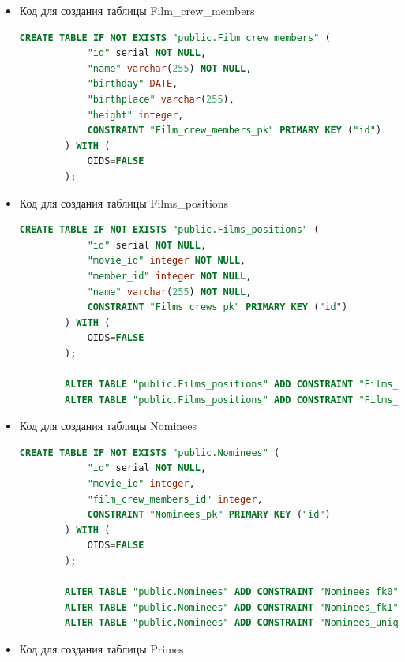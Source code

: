 \documentclass[a4paper,12pt]{article}
\renewcommand{\^}[2]{#1^{\, #2} \kern -1pt}
\newcommand{\1}{\kern 1pt}
\newcommand{\0}{\kern -1pt}
\begin{document}
\begin{itemize}
	\item Код для создания таблицы Film\_crew\_members
	
	\begin{lstlisting}[style=vscode-dark, language=SQL, label={code:sql}]
		CREATE TABLE IF NOT EXISTS "public.Film_crew_members" (
			"id" serial NOT NULL,
			"name" varchar(255) NOT NULL,
			"birthday" DATE,
			"birthplace" varchar(255),
			"height" integer,
			CONSTRAINT "Film_crew_members_pk" PRIMARY KEY ("id")
		) WITH (
			OIDS=FALSE
		);
	\end{lstlisting}

	\item Код для создания таблицы Films\_positions

	\begin{lstlisting}[style=vscode-dark, language=SQL, label={code:sql}]
		CREATE TABLE IF NOT EXISTS "public.Films_positions" (
			"id" serial NOT NULL,
			"movie_id" integer NOT NULL,
			"member_id" integer NOT NULL,
			"name" varchar(255) NOT NULL,
			CONSTRAINT "Films_crews_pk" PRIMARY KEY ("id")
		) WITH (
			OIDS=FALSE
		);
		
		ALTER TABLE "public.Films_positions" ADD CONSTRAINT "Films_positions_fk0" FOREIGN KEY ("movie_id") REFERENCES "public.Movies"("id");
		ALTER TABLE "public.Films_positions" ADD CONSTRAINT "Films_positions_fk1" FOREIGN KEY ("member_id") REFERENCES "public.Film_crew_members"("id");
	\end{lstlisting}
	\newpage
	
	\item Код для создания таблицы Nominees
	
	\begin{lstlisting}[style=vscode-dark, language=SQL, label={code:sql}]
		CREATE TABLE IF NOT EXISTS "public.Nominees" (
			"id" serial NOT NULL,
			"movie_id" integer,
			"film_crew_members_id" integer,
			CONSTRAINT "Nominees_pk" PRIMARY KEY ("id")
		) WITH (
			OIDS=FALSE
		);
		
		ALTER TABLE "public.Nominees" ADD CONSTRAINT "Nominees_fk0" FOREIGN KEY ("movie_id") REFERENCES "public.Movies"("id");
		ALTER TABLE "public.Nominees" ADD CONSTRAINT "Nominees_fk1" FOREIGN KEY ("film_crew_members_id") REFERENCES "public.Film_crew_members"("id");
		ALTER TABLE "public.Nominees" ADD CONSTRAINT "Nominees_unique" UNIQUE("movie_id","film_crew_members_id");
	\end{lstlisting}
	
	\item Код для создания таблицы Primes
	

\end{itemize}
\end{document}
